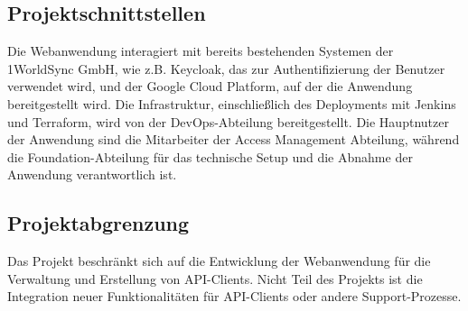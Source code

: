 \subsection{Projektschnittstellen} 
\label{sec:Projektschnittstellen}
Die Webanwendung interagiert mit bereits bestehenden Systemen der 1WorldSync GmbH, wie z.B. Keycloak, das zur Authentifizierung der Benutzer verwendet wird, und der Google Cloud Platform, auf der die Anwendung bereitgestellt wird. Die Infrastruktur, einschließlich des Deployments mit Jenkins und Terraform, wird von der DevOps-Abteilung bereitgestellt. Die Hauptnutzer der Anwendung sind die Mitarbeiter der Access Management Abteilung, während die Foundation-Abteilung für das technische Setup und die Abnahme der Anwendung verantwortlich ist.


\subsection{Projektabgrenzung} 
\label{sec:Projektabgrenzung}
Das Projekt beschränkt sich auf die Entwicklung der Webanwendung für die Verwaltung und Erstellung von API-Clients. Nicht Teil des Projekts ist die Integration neuer Funktionalitäten für API-Clients oder andere Support-Prozesse.
